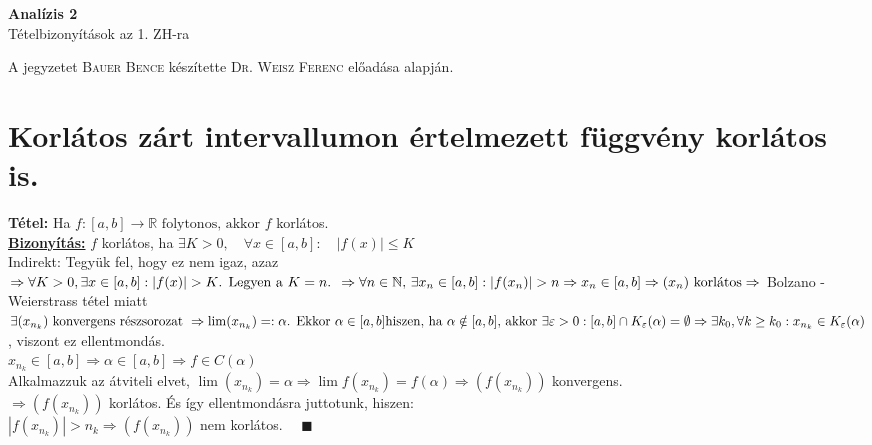 \documentclass[a4paper,12pt]{article}
\begin{document}
	\def\Z{\mathbb{Z}}
	\def\R{\mathbb{R}}
	\def\N{\mathbb{N}}
	\def\sume{\displaystyle\sum_{n=1}^{\infty}}
	\def\sumn{\displaystyle\sum_{n=0}^{\infty}}
	\def\sumeu{\displaystyle\sum_{n=1}}
	\def\sumun{\displaystyle\sum_{n=0}}
	\def\cab{\in C[a,b]}
	\def\dab{\in \D(a,b)}
	\def\biz{\normalsize{\textbf{\underline{Bizonyítás:} }\hspace*{0.5cm}}}
	\def\tetel{\normalsize \textbf{Tétel: }}
	\def\limn{\displaystyle\lim_{n\to +\infty}}
	\def\limh{\displaystyle\lim_{h\to0}}
	\def\limxa{\displaystyle\lim_{x\to a}}
	\def\limxatelj{\displaystyle\lim_{x\to a}\frac{f(x)-f(a)}{x-a}}
	\def\rtr{\displaystyle\R\to\R}
	\def\D{\displaystyle\mathcal{D}}
	\def\lima{\displaystyle\lim_{a}}
	\def\bizva{\quad\blacksquare}
	\def\fda{f\in\D(a)}
	
\begin{center}
	{\LARGE \textbf{Analízis 2}}\\[0.2cm]
	{\large Tételbizonyítások az 1. ZH-ra}
\end{center}
{\small A jegyzetet \textsc{Bauer Bence} készítette \textsc{Dr. Weisz Ferenc} előadása alapján.}
\section{Korlátos zárt intervallumon értelmezett függvény korlátos is.}
	\tetel Ha $f:[a,b]\to\R \text{ folytonos, akkor } f $ korlátos. \\[0.1cm]	
	\biz $f$ korlátos, ha $\exists K>0, \quad \forall x \in [a,b]: \quad |f(x)|\leq K$ \\[0.1cm]
	Indirekt: Tegyük fel, hogy ez nem igaz, azaz\\[0.2cm]	
	$\Rightarrow \forall K>0, \exists x \in [a,b]: |f(x)|> K \text{. Legyen a } K = n \text{. } \Rightarrow \forall n \in \N \text{, } \exists x_n \in [a,b]: |f(x_n)| > n \\[0.1cm] \Rightarrow x_n \in [a,b] \Rightarrow (x_n) \text{ korlátos} \Rightarrow $ Bolzano - Weierstrass tétel miatt \\[0.1cm] $  \exists (x_{n_k}) \text{ konvergens részsorozat } \Rightarrow \lim(x_{n_k}) =: \alpha \text{. Ekkor } \alpha \in [a,b] \\[0.1cm] \text{hiszen, ha } \alpha \notin [a,b] \text{, akkor } \exists \varepsilon > 0: [a,b] \cap K_\varepsilon (\alpha) = \emptyset \\[0.1cm] \Rightarrow \exists k_0 , \forall k \geq k_0: x_{n_k} \in K_\varepsilon (\alpha) $, viszont ez ellentmondás. \\[0.1cm] $ x_{n_k} \in [a,b] \Rightarrow \alpha \in [a,b] \Rightarrow f \in C(\alpha) $ \\[0.1cm] Alkalmazzuk az átviteli elvet, $ \lim(x_{n_k}) = \alpha \Rightarrow \lim f(x_{n_k}) = f(\alpha) \Rightarrow (f (x_{n_k})) $ konvergens. \\[0.1cm] $ \Rightarrow (f (x_{n_k}))$ korlátos. És így ellentmondásra juttotunk, hiszen: \\[0.1cm] $ |f (x_{n_k})| > n_k \Rightarrow (f (x_{n_k}))$ nem korlátos. $\bizva$
\end{document}
